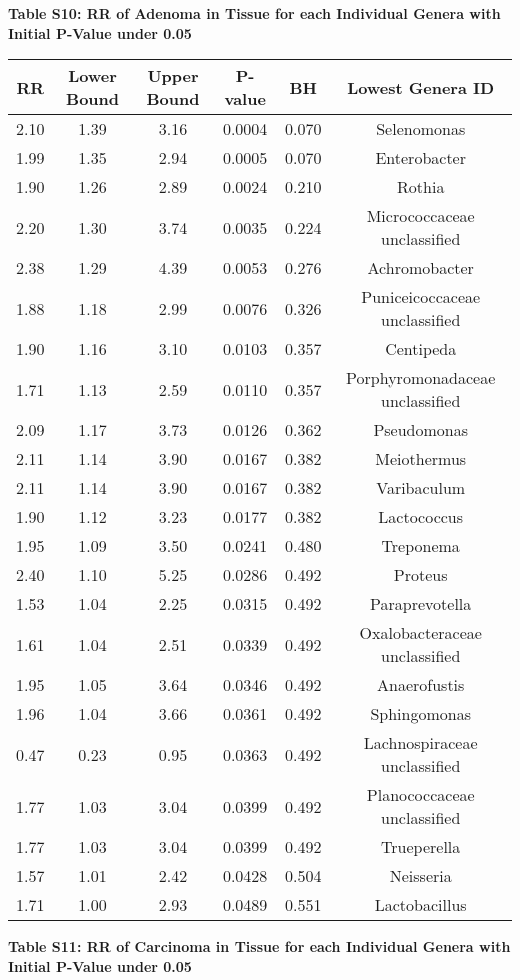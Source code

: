 \documentclass[12pt,]{article}
\begin{document}
\newpage

\textbf{Table S10: RR of Adenoma in Tissue for each Individual Genera
with Initial P-Value under 0.05}

\begin{longtable}[]{@{}cccccc@{}}
\toprule
RR & Lower Bound & Upper Bound & P-value & BH & Lowest Genera
ID\tabularnewline
\midrule
\endhead
2.10 & 1.39 & 3.16 & 0.0004 & 0.070 & Selenomonas\tabularnewline
1.99 & 1.35 & 2.94 & 0.0005 & 0.070 & Enterobacter\tabularnewline
1.90 & 1.26 & 2.89 & 0.0024 & 0.210 & Rothia\tabularnewline
2.20 & 1.30 & 3.74 & 0.0035 & 0.224 & Micrococcaceae
unclassified\tabularnewline
2.38 & 1.29 & 4.39 & 0.0053 & 0.276 & Achromobacter\tabularnewline
1.88 & 1.18 & 2.99 & 0.0076 & 0.326 & Puniceicoccaceae
unclassified\tabularnewline
1.90 & 1.16 & 3.10 & 0.0103 & 0.357 & Centipeda\tabularnewline
1.71 & 1.13 & 2.59 & 0.0110 & 0.357 & Porphyromonadaceae
unclassified\tabularnewline
2.09 & 1.17 & 3.73 & 0.0126 & 0.362 & Pseudomonas\tabularnewline
2.11 & 1.14 & 3.90 & 0.0167 & 0.382 & Meiothermus\tabularnewline
2.11 & 1.14 & 3.90 & 0.0167 & 0.382 & Varibaculum\tabularnewline
1.90 & 1.12 & 3.23 & 0.0177 & 0.382 & Lactococcus\tabularnewline
1.95 & 1.09 & 3.50 & 0.0241 & 0.480 & Treponema\tabularnewline
2.40 & 1.10 & 5.25 & 0.0286 & 0.492 & Proteus\tabularnewline
1.53 & 1.04 & 2.25 & 0.0315 & 0.492 & Paraprevotella\tabularnewline
1.61 & 1.04 & 2.51 & 0.0339 & 0.492 & Oxalobacteraceae
unclassified\tabularnewline
1.95 & 1.05 & 3.64 & 0.0346 & 0.492 & Anaerofustis\tabularnewline
1.96 & 1.04 & 3.66 & 0.0361 & 0.492 & Sphingomonas\tabularnewline
0.47 & 0.23 & 0.95 & 0.0363 & 0.492 & Lachnospiraceae
unclassified\tabularnewline
1.77 & 1.03 & 3.04 & 0.0399 & 0.492 & Planococcaceae
unclassified\tabularnewline
1.77 & 1.03 & 3.04 & 0.0399 & 0.492 & Trueperella\tabularnewline
1.57 & 1.01 & 2.42 & 0.0428 & 0.504 & Neisseria\tabularnewline
1.71 & 1.00 & 2.93 & 0.0489 & 0.551 & Lactobacillus\tabularnewline
\bottomrule
\end{longtable}

\newpage

\textbf{Table S11: RR of Carcinoma in Tissue for each Individual Genera
with Initial P-Value under 0.05}
\end{document}
